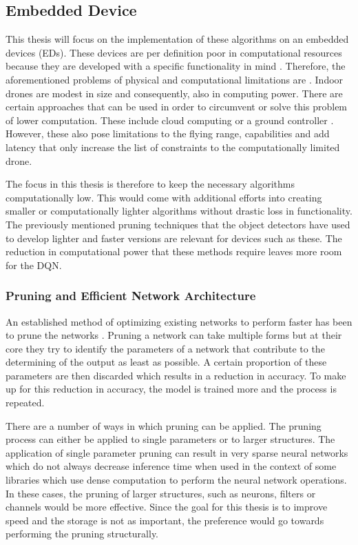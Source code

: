 \subsection{Embedded Device}
This thesis will focus on the implementation
of these algorithms on an embedded devices (EDs). These devices are per definition poor in 
computational resources because they are developed with a specific functionality 
in mind \cite{embeddedsystem}. Therefore, the aforementioned problems of physical and 
computational limitations are . Indoor drones are modest in size and consequently, 
also in computing power. There are certain approaches that can be used in order to 
circumvent or solve this problem of lower computation. These include cloud computing or
a ground controller \cite{cloudcomputingdrone, ParrotARDrone}. However, these also 
pose limitations to the flying range, capabilities and add latency that only 
increase the list of constraints to the computationally limited drone. 

The focus in this thesis is therefore to keep the necessary algorithms  
computationally low. This would come with additional 
efforts into creating smaller or computationally lighter algorithms without
drastic loss in functionality. The previously mentioned pruning techniques that 
the object detectors have used to develop lighter and faster versions are relevant 
for devices such as these. The reduction in computational power that these methods 
require leaves more room for the DQN. 

\subsubsection{Pruning and Efficient Network Architecture}
An established method of optimizing existing networks to perform faster has been 
to prune the networks \cite{pruning}. Pruning a network can take multiple forms but 
at their core they try to identify the parameters of a network that contribute to the 
determining of the output as least as possible. A certain proportion of these 
parameters are then discarded which results in a reduction in accuracy. To make up 
for this reduction in accuracy, the model is trained more and the process is repeated. 

There are a number of ways in which pruning can be applied. The pruning process can 
either be applied to single parameters or to larger structures. The application of 
single parameter pruning can result in very sparse neural networks which do not 
always decrease inference time when used in the context of some libraries which 
use dense computation to perform the neural network operations. In these cases, the 
pruning of larger structures, such as neurons, filters or channels would 
be more effective. Since the goal for this thesis is to improve speed and the 
storage is not as important, the preference would go towards performing the 
pruning structurally. 

